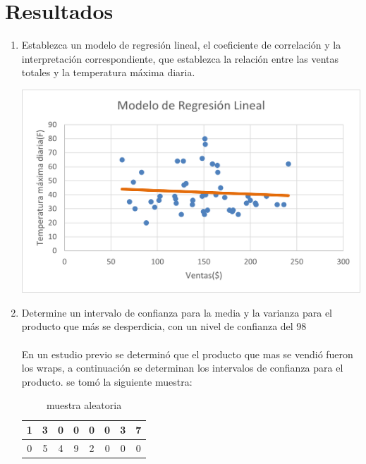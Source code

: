 \documentclass{article}
\begin{document}
\section{Resultados}
\begin{enumerate}
    \item Establezca un modelo de regresión lineal, el coeficiente de correlación y la interpretación correspondiente, que establezca la relación entre las ventas totales y la temperatura máxima diaria.
          \begin{center}
              \includegraphics[width=\textwidth]{Imagen1.png}
              
          \end{center}
    \item Determine un intervalo de confianza para la media y la varianza para el producto que más se desperdicia, con un nivel de confianza del 98%
    \paragraph{}En un estudio previo se determinó que el producto que mas se vendió fueron los wraps, a continuación se determinan los intervalos de confianza para el producto.
    se tomó la siguiente muestra:\\
\begin{table}[htbp]
    \centering
    \caption{muestra aleatoria}
      \begin{tabular}{|c|c|c|c|c|c|c|c|}
      \toprule
      1     & 3     & 0     & 0     & 0     & 0     & 3     & 7 \\
      \midrule
      0     & 5     & 4     & 9     & 2     & 0     & 0     & 0 \\
      \bottomrule
      \end{tabular}%
    \label{tab:addlabel}%
  \end{table}%
   

\end{enumerate}
\end{document}
